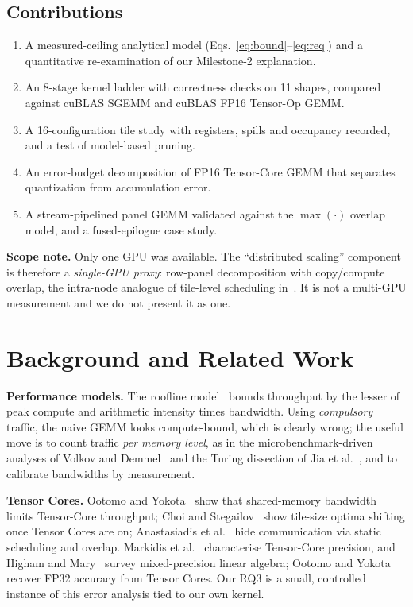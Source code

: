 \documentclass[conference]{IEEEtran}
\begin{document}
\subsection{Contributions}
\begin{enumerate}
\item A measured-ceiling analytical model (Eqs.~\ref{eq:bound}--\ref{eq:req}) and a quantitative re-examination of our Milestone-2 explanation.
\item An 8-stage kernel ladder with correctness checks on 11 shapes, compared against cuBLAS SGEMM and cuBLAS FP16 Tensor-Op GEMM.
\item A 16-configuration tile study with registers, spills and occupancy recorded, and a test of model-based pruning.
\item An error-budget decomposition of FP16 Tensor-Core GEMM that separates quantization from accumulation error.
\item A stream-pipelined panel GEMM validated against the $\max(\cdot)$ overlap model, and a fused-epilogue case study.
\end{enumerate}
\noindent\textbf{Scope note.} Only one GPU was available. The ``distributed scaling'' component is therefore a \emph{single-GPU proxy}: row-panel decomposition with copy/compute overlap, the intra-node analogue of tile-level scheduling in~\cite{uncut}. It is not a multi-GPU measurement and we do not present it as one.

\section{Background and Related Work}
\textbf{Performance models.} The roofline model~\cite{roofline} bounds throughput by the lesser of peak compute and arithmetic intensity times bandwidth. Using \emph{compulsory} traffic, the naive GEMM looks compute-bound, which is clearly wrong; the useful move is to count traffic \emph{per memory level}, as in the microbenchmark-driven analyses of Volkov and Demmel~\cite{volkov} and the Turing dissection of Jia et al.~\cite{jiaturing}, and to calibrate bandwidths by measurement.

\textbf{Tensor Cores.} Ootomo and Yokota~\cite{ootomo23} show that shared-memory bandwidth limits Tensor-Core throughput; Choi and Stegailov~\cite{choi} show tile-size optima shifting once Tensor Cores are on; Anastasiadis et al.~\cite{uncut} hide communication via static scheduling and overlap. Markidis et al.~\cite{markidis} characterise Tensor-Core precision, and Higham and Mary~\cite{higham} survey mixed-precision linear algebra; Ootomo and Yokota~\cite{ootomo22} recover FP32 accuracy from Tensor Cores. Our RQ3 is a small, controlled instance of this error analysis tied to our own kernel.
\end{document}
